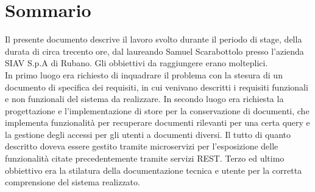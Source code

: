 \cleardoublepage
{}
{}
\begingroup
\let\clearpage\relax
\let\cleardoublepage\relax
\let\cleardoublepage\relax

\chapter*{Sommario}

Il presente documento descrive il lavoro svolto durante il periodo di stage, della durata di circa trecento ore, dal laureando Samuel Scarabottolo presso l'azienda SIAV S.p.A di Rubano.
Gli obbiettivi da raggiungere erano molteplici.\\
In primo luogo era richiesto di inquadrare il problema con la stesura di un documento di specifica dei requisiti, in cui venivano descritti i requisiti funzionali e non funzionali del sistema da realizzare.
In secondo luogo era richiesta la progettazione e l'implementazione di store per la conservazione di documenti, che implementa funzionalità per recuperare documenti rilevanti per una certa query e la gestione degli accessi per gli utenti a documenti diversi.
Il tutto di quanto descritto doveva essere gestito tramite microservizi per l'esposizione delle funzionalità citate precedentemente tramite servizi REST.
Terzo ed ultimo obbiettivo era la stilatura della documentazione tecnica e utente per la corretta comprensione del sistema realizzato.




\endgroup

\vfill
